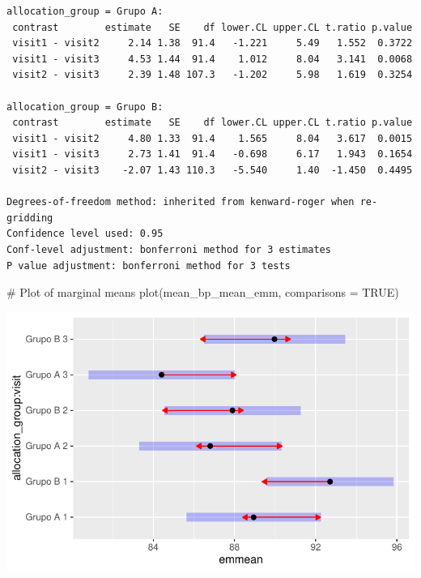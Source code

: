 \documentclass[
  letterpaper,
  DIV=11,
  numbers=noendperiod]{scrartcl}
\newenvironment{Shaded}{\begin{snugshade}}{\end{snugshade}}
\newcommand{\AttributeTok}[1]{\textcolor[rgb]{0.40,0.45,0.13}{#1}}
\newcommand{\CommentTok}[1]{\textcolor[rgb]{0.37,0.37,0.37}{#1}}
\newcommand{\ConstantTok}[1]{\textcolor[rgb]{0.56,0.35,0.01}{#1}}
\newcommand{\FunctionTok}[1]{\textcolor[rgb]{0.28,0.35,0.67}{#1}}
\newcommand{\NormalTok}[1]{\textcolor[rgb]{0.00,0.23,0.31}{#1}}
\begin{document}
\begin{verbatim}
allocation_group = Grupo A:
 contrast        estimate   SE    df lower.CL upper.CL t.ratio p.value
 visit1 - visit2     2.14 1.38  91.4   -1.221     5.49   1.552  0.3722
 visit1 - visit3     4.53 1.44  91.4    1.012     8.04   3.141  0.0068
 visit2 - visit3     2.39 1.48 107.3   -1.202     5.98   1.619  0.3254

allocation_group = Grupo B:
 contrast        estimate   SE    df lower.CL upper.CL t.ratio p.value
 visit1 - visit2     4.80 1.33  91.4    1.565     8.04   3.617  0.0015
 visit1 - visit3     2.73 1.41  91.4   -0.698     6.17   1.943  0.1654
 visit2 - visit3    -2.07 1.43 110.3   -5.540     1.40  -1.450  0.4495

Degrees-of-freedom method: inherited from kenward-roger when re-gridding 
Confidence level used: 0.95 
Conf-level adjustment: bonferroni method for 3 estimates 
P value adjustment: bonferroni method for 3 tests 
\end{verbatim}

\begin{Shaded}
\begin{Highlighting}[]
\CommentTok{\# Plot of marginal means}
\FunctionTok{plot}\NormalTok{(mean\_bp\_mean\_emm, }\AttributeTok{comparisons =} \ConstantTok{TRUE}\NormalTok{)}
\end{Highlighting}
\end{Shaded}

\includegraphics{Outcomes_V1V2V3_files/figure-pdf/mean_bp_mean_sens_emm-1.pdf}
\end{document}
